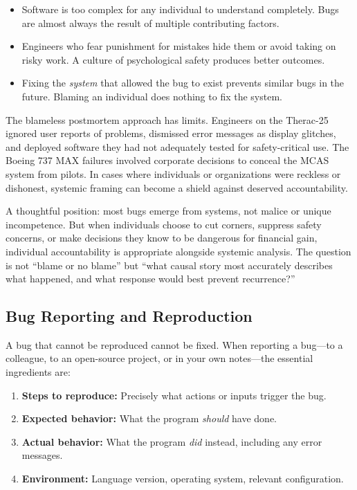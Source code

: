 \documentclass[11pt,letterpaper]{article}
\begin{document}
\begin{itemize}[itemsep=3pt]
    \item Software is too complex for any individual to understand completely. Bugs are almost always the result of multiple contributing factors.
    \item Engineers who fear punishment for mistakes hide them or avoid taking on risky work. A culture of psychological safety produces better outcomes.
    \item Fixing the \textit{system} that allowed the bug to exist prevents similar bugs in the future. Blaming an individual does nothing to fix the system.
\end{itemize}

\begin{debatebox}
The blameless postmortem approach has limits. Engineers on the Therac-25 ignored user reports of problems, dismissed error messages as display glitches, and deployed software they had not adequately tested for safety-critical use. The Boeing 737 MAX failures involved corporate decisions to conceal the MCAS system from pilots. In cases where individuals or organizations were reckless or dishonest, systemic framing can become a shield against deserved accountability.

A thoughtful position: most bugs emerge from systems, not malice or unique incompetence. But when individuals choose to cut corners, suppress safety concerns, or make decisions they know to be dangerous for financial gain, individual accountability is appropriate alongside systemic analysis. The question is not ``blame or no blame'' but ``what causal story most accurately describes what happened, and what response would best prevent recurrence?''
\end{debatebox}

\subsection{Bug Reporting and Reproduction}

A bug that cannot be reproduced cannot be fixed. When reporting a bug---to a colleague, to an open-source project, or in your own notes---the essential ingredients are:

\begin{enumerate}[itemsep=3pt]
    \item \textbf{Steps to reproduce:} Precisely what actions or inputs trigger the bug.
    \item \textbf{Expected behavior:} What the program \textit{should} have done.
    \item \textbf{Actual behavior:} What the program \textit{did} instead, including any error messages.
    \item \textbf{Environment:} Language version, operating system, relevant configuration.
\end{enumerate}
\end{document}
